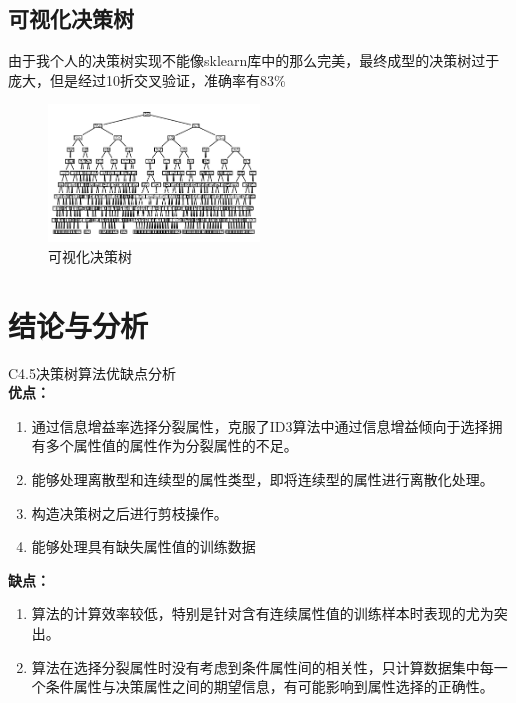 \documentclass{sdureport}
\begin{document}
\begin{sduDocument}
	\subsection{可视化决策树}

	由于我个人的决策树实现不能像sklearn库中的那么完美，最终成型的决策树过于庞大，但是经过10折交叉验证，准确率有83\%

	\begin{figure}[H]
		\begin{center}
		\includegraphics[width=0.5\textwidth]{image/1.png}
		\end{center}
		\caption{可视化决策树}
	\end{figure}

	\section{结论与分析}

	C4.5决策树算法优缺点分析\\

	\textbf{优点：}
	\begin{enumerate}
		\item 通过信息增益率选择分裂属性，克服了ID3算法中通过信息增益倾向于选择拥有多个属性值的属性作为分裂属性的不足。
		\item 能够处理离散型和连续型的属性类型，即将连续型的属性进行离散化处理。
		\item 构造决策树之后进行剪枝操作。
		\item 能够处理具有缺失属性值的训练数据
	\end{enumerate}

	\textbf{缺点：}
	\begin{enumerate}
		\item 算法的计算效率较低，特别是针对含有连续属性值的训练样本时表现的尤为突出。
		\item 算法在选择分裂属性时没有考虑到条件属性间的相关性，只计算数据集中每一个条件属性与决策属性之间的期望信息，有可能影响到属性选择的正确性。
	\end{enumerate}

\end{sduDocument}
\end{document}
